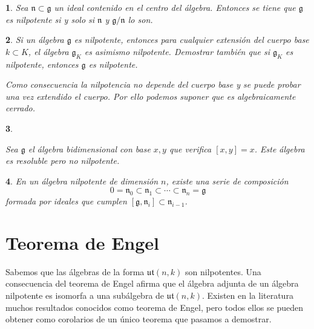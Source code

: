 \documentclass[a4paper,draft,12pt]{scrartcl}
\newtheorem{pro1}{}%
\newenvironment{pro}{\begin{pro1} \rm} {\end{pro1}}
\newcommand{\g}{\mathfrak{g}}%
\begin{document}
\begin{pro}

Sea $\mathfrak{n} \subset \g$ un ideal contenido en el centro del álgebra.  Entonces se tiene que $\g$ es nilpotente si y solo si $\mathfrak{n}$ y $\g/\mathfrak{n}$ lo son.

\end{pro}

\begin{pro}

Si un álgebra $\g$ es nilpotente, entonces para cualquier extensión del cuerpo base $k \subset K$, el álgebra $\g_K$ es asimismo nilpotente.  Demostrar también que si $\g_K$ es nilpotente, entonces $\g$ es nilpotente.

Como consecuencia la nilpotencia no depende del cuerpo base y se puede probar una vez extendido el cuerpo.  Por ello podemos suponer que es algebraicamente cerrado.

\end{pro}



\begin{pro}\label{pro:resolublenilpotente}

Sea $\g$ el álgebra bidimensional con base $x,y$ que verifica $[x,y]=x$.  Este álgebra es resoluble pero no nilpotente.

\end{pro}


\begin{pro}

En un álgebra nilpotente de dimensión $n$, existe una serie de composición
$$
0 = \mathfrak{n}_0 \subset \mathfrak{n}_1 \subset \cdots \subset \mathfrak{n}_n= \g
$$
formada por ideales que cumplen $[\g, \mathfrak{n}_i]\subset \mathfrak{n}_{i-1}$.

\end{pro}

\newpage

\section{Teorema de Engel}

Sabemos que las álgebras de la forma $\mathfrak{ut}(n,k)$ son nilpotentes.  Una consecuencia del teorema de  Engel afirma que el álgebra adjunta de un álgebra nilpotente  es isomorfa a una subálgebra de $\mathfrak{ut}(n,k)$.  Existen en la literatura muchos resultados conocidos como teorema de Engel, pero todos ellos se pueden obtener como corolarios de un único  teorema  que pasamos a demostrar.
\end{document}
